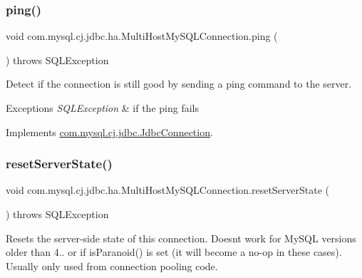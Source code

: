\subsubsection{\texorpdfstring{ping()}{ping()}}
{\footnotesize\ttfamily void com.\+mysql.\+cj.\+jdbc.\+ha.\+Multi\+Host\+My\+S\+Q\+L\+Connection.\+ping (\begin{DoxyParamCaption}{ }\end{DoxyParamCaption}) throws S\+Q\+L\+Exception}

Detect if the connection is still good by sending a ping command to the server.


\begin{DoxyExceptions}{Exceptions}
{\em S\+Q\+L\+Exception} & if the ping fails \\
\hline
\end{DoxyExceptions}


Implements \mbox{\hyperlink{interfacecom_1_1mysql_1_1cj_1_1jdbc_1_1_jdbc_connection_a6d078258f83ddc438d64bafb0f665004}{com.\+mysql.\+cj.\+jdbc.\+Jdbc\+Connection}}.

\mbox{\label{classcom_1_1mysql_1_1cj_1_1jdbc_1_1ha_1_1_multi_host_my_s_q_l_connection_aa4aba4efd08774027532a7a9092bca57}} 
\subsubsection{\texorpdfstring{reset\+Server\+State()}{resetServerState()}}
{\footnotesize\ttfamily void com.\+mysql.\+cj.\+jdbc.\+ha.\+Multi\+Host\+My\+S\+Q\+L\+Connection.\+reset\+Server\+State (\begin{DoxyParamCaption}{ }\end{DoxyParamCaption}) throws S\+Q\+L\+Exception}

Resets the server-\/side state of this connection. Doesn\textquotesingle{}t work for My\+S\+QL versions older than 4.. or if is\+Paranoid() is set (it will become a no-\/op in these cases). Usually only used from connection pooling code.


